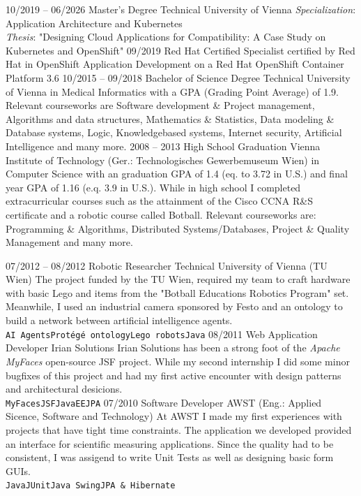 \documentclass[9pt]{developercv} %
\begin{document}
\begin{entrylist}
	\entry
		{10/2019 -- 06/2026}
		{Master's Degree}
		{Technical University of Vienna}
		{\textit{Specialization}: Application Architecture and Kubernetes \\ 
		\textit{Thesis}: "Designing Cloud Applications for Compatibility: A Case Study on Kubernetes and OpenShift"
		}
	\entry
		{09/2019}
		{Red Hat Certified Specialist}
		{certified by Red Hat}
		{in OpenShift Application Development on a Red Hat OpenShift Container Platform 3.6}
	\entry
		{10/2015 -- 09/2018}
		{Bachelor of Science Degree}
		{Technical University of Vienna}
		{in Medical Informatics with a GPA (Grading Point Average) of 1.9. Relevant courseworks are Software development \& Project management, Algorithms and data structures, Mathematics \& Statistics, Data modeling \& Database systems, Logic, Knowledgebased systems, Internet security, Artificial Intelligence and many more.}
	\entry
		{2008 -- 2013}
		{High School Graduation}
		{Vienna Institute of Technology (Ger.: Technologisches Gewerbemuseum Wien)}
		{in Computer Science with an graduation GPA of 1.4 (eq. to 3.72 in U.S.) and final year GPA of 1.16 (e.q. 3.9 in U.S.). While in high school I completed extracurricular courses such as the  attainment of the Cisco CCNA R\&S certificate and a robotic course called Botball.  Relevant courseworks are: Programming \& Algorithms, Distributed Systems/Databases, Project \& Quality Management and many more.}
\end{entrylist}


\begin{entrylist}
	\entry
	{07/2012 -- 08/2012}
	{Robotic Researcher}
	{Technical University of Vienna (TU Wien)}
	{The project funded by the TU Wien, required my team to craft hardware with basic Lego and items from the "Botball Educations Robotics Program" set. Meanwhile, I used an industrial camera sponsored by Festo and an ontology to build a network between artificial intelligence agents.\\ 
		\texttt{AI Agents}\slashsep\texttt{Protégé ontology}\slashsep\texttt{Lego robots}\slashsep\texttt{Java}}
	\entry
	{08/2011}
	{Web Application Developer}
	{Irian Solutions}
	{Irian Solutions has been a strong foot of the \textit{Apache MyFaces} open-source JSF project. While my second internship I did some minor bugfixes of this project and had my first active encounter with design patterns and architectural desicions.\\ 
		\texttt{MyFaces}\slashsep\texttt{JSF}\slashsep\texttt{JavaEE}\slashsep\texttt{JPA}}
	\entry
	{07/2010}
	{Software Developer}
	{AWST (Eng.: Applied Sicence, Software and Technology)}
	{At AWST I made my first experiences with projects that have tight time constraints. The application we developed provided an interface for scientific measuring applications. Since the quality had to be consistent, I was assigend to write Unit Tests as well as designing basic form GUIs.  \\ 
	\texttt{Java}\slashsep\texttt{JUnit}\slashsep\texttt{Java Swing}\slashsep\texttt{JPA \& Hibernate}}
\end{entrylist}
\end{document}
